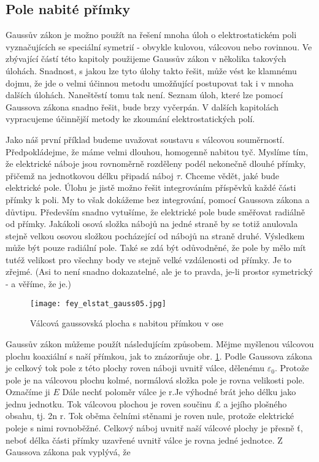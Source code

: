     \subsection{Pole nabité přímky}
      Gaussův zákon je možno použít na řešení mnoha úloh o elektrostatickém poli vyznačujících se speciální 
      symetrií - obvykle kulovou, válcovou nebo rovinnou. Ve zbývající částí této kapitoly použijeme Gaussův 
      zákon v několika takových úlohách. Snadnost, s jakou lze tyto úlohy takto řešit, může vést ke klamnému 
      dojmu, že jde o velmi účinnou metodu umožňující postupovat tak i v mnoha dalších úlohách. Naneštěstí 
      tomu tak není. Seznam úloh, které lze pomocí Gaussova zákona snadno řešit, bude brzy vyčerpán. V 
      dalších kapitolách vypracujeme účinnější metody ke zkoumání elektrostatických polí.
      
      Jako náš první příklad budeme uvažovat soustavu s válcovou souměrností. Předpokládejme, že máme velmi 
      dlouhou, homogenně nabitou tyč. Myslíme tím, že elektrické náboje jsou rovnoměrně rozděleny podél 
      nekonečně dlouhé přímky, přičemž na jednotkovou délku připadá náboj \(\tau\). Chceme vědět, jaké bude 
      elektrické pole. Úlohu je jistě možno řešit integrováním příspěvků každé části přímky k poli. My to 
      však dokážeme bez integrování, pomocí Gaussova zákona a důvtipu. Především snadno vytušíme, že 
      elektrické pole bude směřovat radiálně od přímky. Jakákoli osová složka nábojů na jedné straně by se 
      totiž anulovala stejně velkou osovou složkou pocházející od nábojů na straně druhé. Výsledkem může být 
      pouze radiální pole. Také se zdá být odůvodněné, že pole by mělo mít tutéž velikost pro všechny body ve 
      stejně velké vzdálenosti od přímky. Je to zřejmé. (Asi to není snadno dokazatelné, ale je to pravda, 
      je-li prostor symetrický - a věříme, že je.)
      
      \begin{figure}[ht!] %
        \centering
        \texttt{[image: fey\_elstat\_gauss05.jpg]}
        \caption{Válcová gaussovská plocha s nabitou přímkou v ose}
        \label{fyz:fig_fey_elstat_gauss05}
      \end{figure}  
      
      Gaussův zákon můžeme použít následujícím způsobem. Mějme myšlenou válcovou plochu koaxiální s naší 
      přímkou, jak to znázorňuje obr. \ref{fyz:fig_fey_elstat_gauss05}. Podle Gaussova zákona je celkový tok 
      pole z této plochy roven náboji uvnitř válce, dělenému \(\varepsilon_0\). Protože pole je na válcovou 
      plochu kolmé, normálová složka pole je rovna velikosti pole. Označíme ji \(E\) Dále nechť poloměr válce 
      je r.Je výhodné brát jeho délku jako jednu jednotku. Tok válcovou plochou je roven součinu £ a jejího 
      plošného obsahu, tj. 2n r. Tok oběma čelními stěnami je roven nule, protože elektrické poleje s nimi 
      rovnoběžné. Celkový náboj uvnitř naší válcové plochy je přesně ť, neboť délka části přímky uzavřené 
      uvnitř válce je rovna jedné jednotce. Z Gaussova zákona pak vyplývá, že
      
    
\printbibliography[heading=subbibliography]